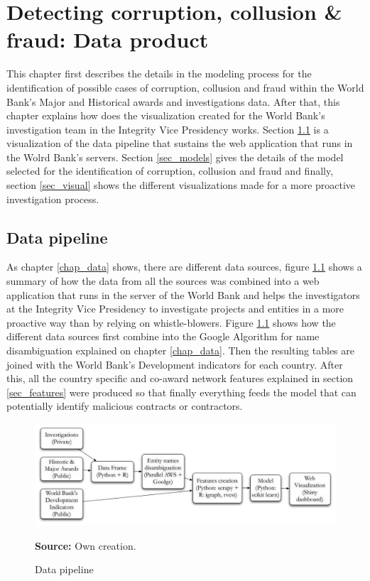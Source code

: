 \chapter{Detecting corruption, collusion \& fraud: Data product}\label{chap_product}


This chapter first describes the details in the modeling process for the identification of possible cases of corruption, collusion and fraud within the World Bank's Major and Historical awards and investigations data. After that, this chapter explains  how does the visualization created for the World Bank's investigation team in the Integrity Vice Presidency works. Section \ref{sec_pipeline} is a visualization of the data pipeline that sustains the web application that runs in the Wolrd Bank's servers. Section \ref{sec_models} gives the details of the model selected for the identification of corruption, collusion and fraud and finally, section \ref{sec_visual} shows the different visualizations made for a more proactive investigation process.

\section{Data pipeline} \label{sec_pipeline}

As chapter \ref{chap_data} shows, there are different data sources, figure \ref{fig_pipeline} shows a summary of how the data from all the sources was combined into a web application that runs in the server of the World Bank and helps the investigators at the Integrity Vice Presidency to investigate projects and entities in a more proactive way than by relying on whistle-blowers. Figure \ref{fig_pipeline} shows how the different data sources first combine into the Google Algorithm for name disambiguation explained on chapter \ref{chap_data}. Then the resulting tables are joined with the World Bank's Development indicators for each country. After this, all the country specific and co-award network features explained in section \ref{sec_features} were produced so that finally everything feeds the model that can potentially identify malicious contracts or contractors.

\begin{figure}[H]
\begin{center}
\caption{Data pipeline}
\label{fig_pipeline}
\includegraphics[width=\textwidth,height=1\textheight,keepaspectratio]{../img/pipeline.pdf}
\end{center}
\noindent \footnotesize{\textbf{Source:} Own creation.}
\end{figure}

